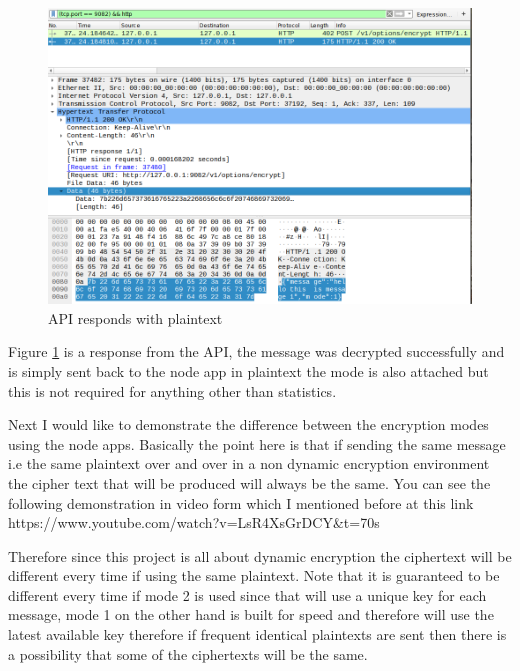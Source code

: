 \begin{figure}[!h]
  \centering
      \includegraphics[width=1\textwidth]{Figures/b15.png}
  \caption[API responds with plaintext]{API responds with plaintext}
  \label{fig:b15}
\end{figure}
\FloatBarrier

Figure \ref{fig:b15} is a response from the API, the message was decrypted successfully and is simply sent back to the node app in plaintext the mode is also attached but this is not required for anything other than statistics. 


Next I would like to demonstrate the difference between the encryption modes using the node apps. Basically the point here is that if sending the same message i.e the same plaintext over and over in a non dynamic encryption environment the cipher text that will be produced will always be the same. 
You can see the following demonstration in video form which I mentioned before at this link https://www.youtube.com/watch?v=LsR4XsGrDCY&t=70s

Therefore since this project is all about dynamic encryption the ciphertext will be different every time if using the same plaintext. Note that it is guaranteed to be different every time if mode 2 is used since that will use a unique key for each message, mode 1 on the other hand is built for speed and therefore will use the latest available key therefore if frequent identical plaintexts are sent then there is a possibility that some of the ciphertexts will be the same. 

